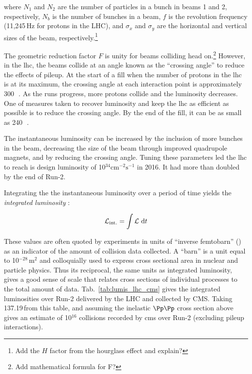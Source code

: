 where $N_1$ and $N_2$ are the number of particles in a bunch in beams 1 and 2, respectively, $N_b$ is the number of bunches in a beam, $f$ is the revolution frequency (11,245\,Hz for protons in the LHC), and $\sigma_x$ and $\sigma_y$ are the horizontal and vertical sizes of the beam, respectively.\footnote{Add the $H$ factor from the hourglass effect and explain?}

The geometric reduction factor $F$ is unity for beams colliding head on.\footnote{Add mathematical formula for F?} However, in the \acrshort{lhc}, the beams collide at an angle known as the ``crossing angle'' to reduce the effects of pileup. At the start of a fill when the number of protons in the \acrshort{lhc} is at its maximum, the crossing angle at each interaction point is approximately 300\,\si{\micro{}}. As the runs progress, more protons collide and the luminosity decreases. One of measures taken to recover luminosity and keep the \acrshort{lhc} as efficient as possible is to reduce the crossing angle. By the end of the fill, it can be as small as 240\,\si{\micro{}}.


The instantaneous luminosity can be increased by the inclusion of more bunches in the beam, decreasing the size of the beam through improved quadrupole magnets, and by reducing the crossing angle. Tuning these parameters led the \acrshort{lhc} to reach is design luminosity of 10$^{34}\text{cm}^{-2}\text{s}^{-1}$ in 2016. It had more than doubled by the end of Run-2.

Integrating the the instantaneous luminosity over a period of time yields the \emph{integrated luminosity} \intlumi:

\begin{equation}
    \intlumi = \int \mathcal{L} \ \mathrm{d}t
    \label{eq:lumi_integrated}
\end{equation}

These values are often quoted by experiments in units of ``inverse femtobarn'' (\fbinv) as an indicator of the amount of collision data collected. A ``barn'' is a unit equal to 10$^{-28}$\,m$^2$ and colloquially used to express cross sectional area in nuclear and particle physics. Thus its reciprocal, the same units as integrated luminosity, gives a good sense of scale that relates cross sections of individual processes to the total amount of data. Tab.~\ref{tab:lumis_lhc_cms} gives the integrated luminosities over Run-2 delivered by the LHC and collected by CMS. Taking 137.19\,\fbinv from this table, and assuming the inelastic $\Pp\Pp$ cross section above gives an estimate of 10$^{16}$ collisions recorded by \acrshort{cms} over Run-2 (excluding pileup interactions).


